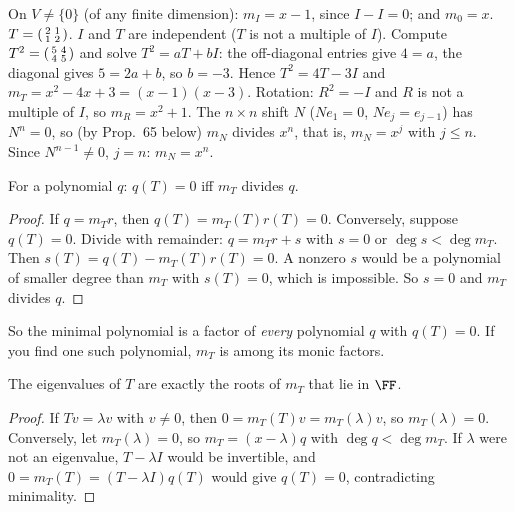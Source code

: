 \documentclass[10pt]{scrartcl}
\begin{document}
\begin{example*}[Ex.~57, 58]
  \leavevmode
  \begin{itemize}
    \ii On $V\ne\{0\}$ (of any finite dimension): $m_I=x-1$, since $I-I=0$; and $m_0=x$.
    \ii $T=\begin{psmallmatrix}2&1\\1&2\end{psmallmatrix}$. $I$ and $T$ are independent ($T$ is not a multiple of $I$). Compute $T^2=\begin{psmallmatrix}5&4\\4&5\end{psmallmatrix}$ and solve $T^2=aT+bI$: the off-diagonal entries give $4=a$, the diagonal gives $5=2a+b$, so $b=-3$. Hence $T^2=4T-3I$ and $m_T=x^2-4x+3=(x-1)(x-3)$.
    \ii Rotation: $R^2=-I$ and $R$ is not a multiple of $I$, so $m_R=x^2+1$.
    \ii The $n\times n$ shift $N$ ($Ne_1=0$, $Ne_j=e_{j-1}$) has $N^n=0$, so (by Prop.~65 below) $m_N$ divides $x^n$, that is, $m_N=x^j$ with $j\le n$. Since $N^{n-1}\ne0$, $j=n$: $m_N=x^n$.
  \end{itemize}
\end{example*}

\begin{proposition*}
  For a polynomial $q$: $q(T)=0$ iff $m_T$ divides $q$.
\end{proposition*}
\begin{proof}
  If $q=m_Tr$, then $q(T)=m_T(T)r(T)=0$. Conversely, suppose $q(T)=0$. Divide with remainder: $q=m_Tr+s$ with $s=0$ or $\deg s<\deg m_T$. Then $s(T)=q(T)-m_T(T)r(T)=0$. A nonzero $s$ would be a polynomial of smaller degree than $m_T$ with $s(T)=0$, which is impossible. So $s=0$ and $m_T$ divides $q$.
\end{proof}
So the minimal polynomial is a factor of \emph{every} polynomial $q$ with $q(T)=0$. If you find one such polynomial, $m_T$ is among its monic factors.

\begin{proposition*}
  The eigenvalues of $T$ are exactly the roots of $m_T$ that lie in $\FF$.
\end{proposition*}
\begin{proof}
  If $Tv=\lambda v$ with $v\ne0$, then $0=m_T(T)v=m_T(\lambda)v$, so $m_T(\lambda)=0$.
  Conversely, let $m_T(\lambda)=0$, so $m_T=(x-\lambda)q$ with $\deg q<\deg m_T$. If $\lambda$ were not an eigenvalue, $T-\lambda I$ would be invertible, and $0=m_T(T)=(T-\lambda I)q(T)$ would give $q(T)=0$, contradicting minimality.
\end{proof}
\end{document}
